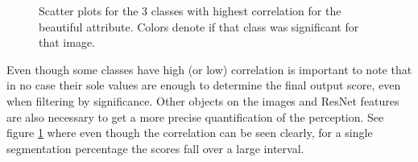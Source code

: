 \begin{figure}[ht]
	\centering
	\hspace{0mm}
	\caption{
		Scatter plots for the 3 classes with highest correlation for the beautiful attribute.
		Colors denote if that class was significant for that image.
	}
	\label{fig:scatters}
\end{figure}

Even though some classes have high (or low) correlation is important to note that in no case
their sole values are enough to determine the final output score, even when filtering by significance.
Other objects on the images and ResNet features are also necessary to get a more precise
quantification of the perception. See figure \ref{fig:scatters} where even though the correlation
can be seen clearly, for a single segmentation percentage the scores fall over a large interval.

